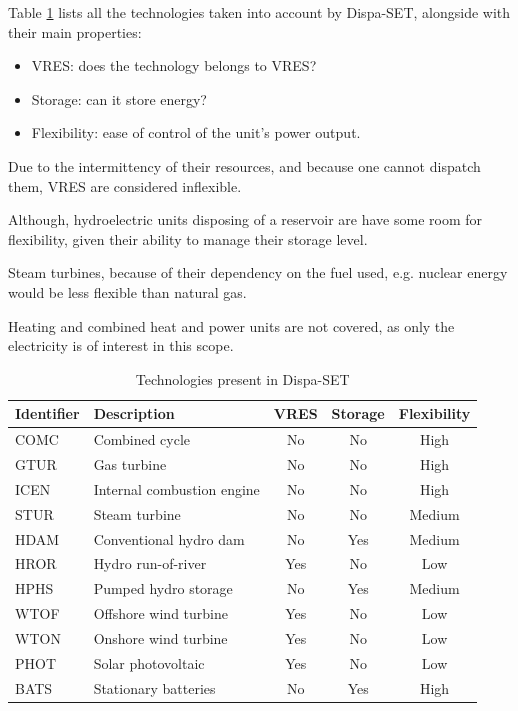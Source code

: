 Table \ref{table:technologies-eu} lists all the technologies taken into account by Dispa-SET, alongside with their main properties: 

\begin{itemize}
    \item VRES: does the technology belongs to VRES?
    \item Storage: can it store energy?
    \item Flexibility: ease of control of the unit's power output.
\end{itemize}

Due to the intermittency of their resources, and because one cannot dispatch them, VRES are considered inflexible.

Although, hydroelectric units disposing of a reservoir are have some room for flexibility, given their ability to manage their storage level.

Steam turbines, because of their dependency on the fuel used, e.g. nuclear energy would be less flexible than natural gas.

Heating and combined heat and power units are not covered, as only the electricity is of interest in this scope.

\begin{table}
    \centering
    \begin{tabular}{|l l c c c|}
        \hline
		Identifier & Description & VRES & Storage & Flexibility\\
		\hline
		COMC & Combined cycle             & No  & No  & High\\
		GTUR & Gas turbine                & No  & No  & High\\
		ICEN & Internal combustion engine & No  & No  & High\\
		STUR & Steam turbine              & No  & No  & Medium\\
		HDAM & Conventional hydro dam     & No  & Yes & Medium \\
		HROR & Hydro run-of-river         & Yes & No  & Low\\
		HPHS & Pumped hydro storage       & No  & Yes & Medium\\
		WTOF & Offshore wind turbine      & Yes & No  & Low\\
		WTON & Onshore wind turbine       & Yes & No  & Low\\
		PHOT & Solar photovoltaic         & Yes & No  & Low\\
		BATS & Stationary batteries       & No  & Yes & High\\
		\hline
    \end{tabular}
    \caption{Technologies present in Dispa-SET}
    \label{table:technologies-eu}
\end{table}


